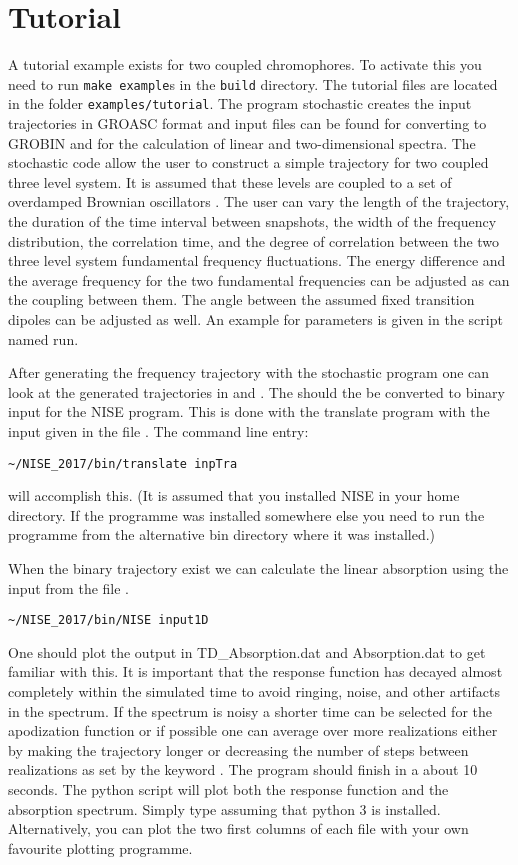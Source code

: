 \chapter{Tutorial}
A tutorial example exists for two coupled chromophores. To activate this you need to run {\tt make example}s in the {\tt build} directory. The tutorial files are located in the folder {\tt examples/tutorial}. The program stochastic creates the input 
trajectories in GROASC format and input files can be found for converting to GROBIN and for the
calculation of linear and two-dimensional spectra. The stochastic code allow the user to construct
a simple trajectory for two coupled three level system. It is assumed that these levels are coupled
to a set of overdamped Brownian oscillators \cite{Mukamel.1995.B01}.
The user can vary the length of the trajectory, the duration of the time interval between snapshots, the 
width of the frequency distribution, the correlation time, and the degree of correlation between the
two three level system fundamental frequency fluctuations. The energy difference and the average frequency for the two fundamental frequencies can be adjusted as can the coupling between them.
The angle between the assumed fixed transition dipoles can be adjusted as well. An example for
parameters is given in the script named run. 

After generating the frequency trajectory with the stochastic program one can look at the generated
trajectories in  and . The should the be converted to binary input for the NISE
program. This is done with the translate program with the input given in the file .
The command line entry:
\begin{lstlisting}[style=mystyle]
~/NISE_2017/bin/translate inpTra
\end{lstlisting}
will accomplish this. (It is assumed that you installed NISE in your home directory. If the programme was installed somewhere else you need to run the programme from the alternative bin directory where it was installed.)

When the binary trajectory exist we can calculate the linear absorption using the input from the file .
\begin{lstlisting}[style=mystyle]
~/NISE_2017/bin/NISE input1D
\end{lstlisting}
One should plot the output in TD\_Absorption.dat and Absorption.dat to get familiar with this. It is 
important that the response function has decayed almost completely within the simulated 
time to avoid ringing, noise, and other artifacts in the spectrum. 
If the spectrum is noisy a shorter time can be selected for the apodization function or if possible one can average over more realizations either by making the trajectory longer or decreasing the number of steps between realizations as set by the keyword .
The program should finish in a 
about 10 seconds. The python script  will plot both the response function and the absorption spectrum. Simply type  assuming that python 3 is installed. Alternatively, you can plot the two first columns of each file with your own favourite plotting programme.

